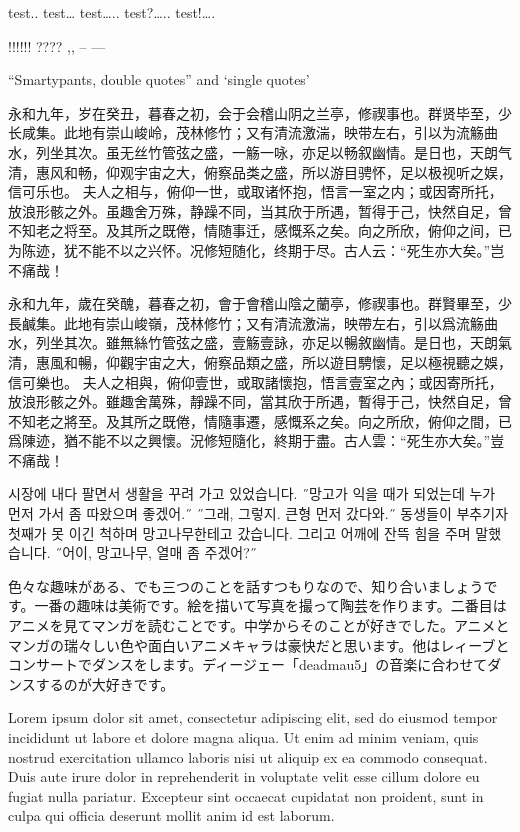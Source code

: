 \documentclass[
  paper=a4,
  ,captions=tableheading
]{scrartcl}
\begin{document}
test.. test\ldots{} test\ldots.. test?\ldots.. test!\ldots.

!!!!!! ???? ,, -- ---

``Smartypants, double quotes'' and `single quotes'

永和九年，岁在癸丑，暮春之初，会于会稽山阴之兰亭，修禊事也。群贤毕至，少长咸集。此地有崇山峻岭，茂林修竹；又有清流激湍，映带左右，引以为流觞曲水，列坐其次。虽无丝竹管弦之盛，一觞一咏，亦足以畅叙幽情。是日也，天朗气清，惠风和畅，仰观宇宙之大，俯察品类之盛，所以游目骋怀，足以极视听之娱，信可乐也。
夫人之相与，俯仰一世，或取诸怀抱，悟言一室之内；或因寄所托，放浪形骸之外。虽趣舍万殊，静躁不同，当其欣于所遇，暂得于己，快然自足，曾不知老之将至。及其所之既倦，情随事迁，感慨系之矣。向之所欣，俯仰之间，已为陈迹，犹不能不以之兴怀。况修短随化，终期于尽。古人云：``死生亦大矣。''岂不痛哉！

永和九年，歲在癸醜，暮春之初，會于會稽山陰之蘭亭，修禊事也。群賢畢至，少長鹹集。此地有崇山峻嶺，茂林修竹；又有清流激湍，映帶左右，引以爲流觞曲水，列坐其次。雖無絲竹管弦之盛，壹觞壹詠，亦足以暢敘幽情。是日也，天朗氣清，惠風和暢，仰觀宇宙之大，俯察品類之盛，所以遊目騁懷，足以極視聽之娛，信可樂也。
夫人之相與，俯仰壹世，或取諸懷抱，悟言壹室之內；或因寄所托，放浪形骸之外。雖趣舍萬殊，靜躁不同，當其欣于所遇，暫得于己，快然自足，曾不知老之將至。及其所之既倦，情隨事遷，感慨系之矣。向之所欣，俯仰之間，已爲陳迹，猶不能不以之興懷。況修短隨化，終期于盡。古人雲：``死生亦大矣。''豈不痛哉！

시장에 내다 팔면서 생활을 꾸려 가고 있었습니다. ˝망고가 익을 때가
되었는데 누가 먼저 가서 좀 따왔으며 좋겠어.˝ ˝그래, 그렇지. 큰형 먼저
갔다와.˝ 동생들이 부추기자 첫째가 못 이긴 척하며 망고나무한테고
갔습니다. 그리고 어깨에 잔뜩 힘을 주며 말했습니다. ˝어이, 망고나무, 열매
좀 주겠어?˝

色々な趣味がある、でも三つのことを話すつもりなので、知り合いましょうです。一番の趣味は美術です。絵を描いて写真を撮って陶芸を作ります。二番目はアニメを見てマンガを読むことです。中学からそのことが好きでした。アニメとマンガの瑞々しい色や面白いアニメキャラは豪快だと思います。他はレィーブとコンサートでダンスをします。ディージェー「deadmau5」の音楽に合わせてダンスするのが大好きです。

Lorem ipsum dolor sit amet, consectetur adipiscing elit, sed do eiusmod
tempor incididunt ut labore et dolore magna aliqua. Ut enim ad minim
veniam, quis nostrud exercitation ullamco laboris nisi ut aliquip ex ea
commodo consequat. Duis aute irure dolor in reprehenderit in voluptate
velit esse cillum dolore eu fugiat nulla pariatur. Excepteur sint
occaecat cupidatat non proident, sunt in culpa qui officia deserunt
mollit anim id est laborum.
\end{document}
